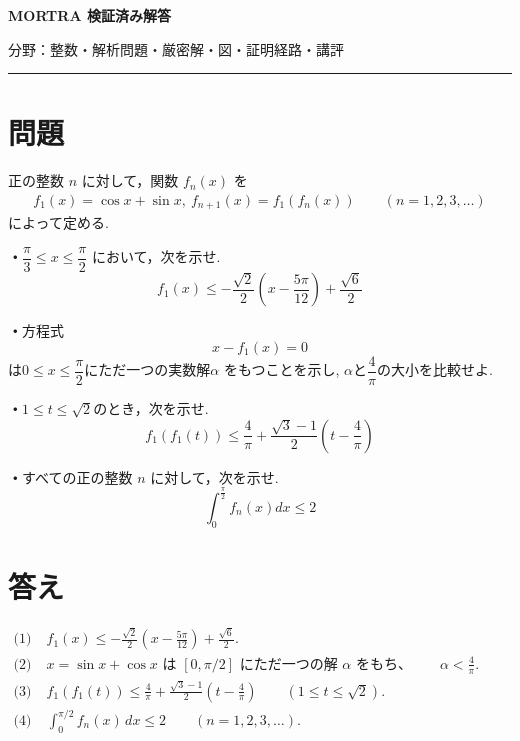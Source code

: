 \documentclass[uplatex,dvipdfmx,11pt]{jsarticle}
\begin{document}
\begin{center}
{\LARGE\bfseries MORTRA 検証済み解答\par}
\vspace{1mm}
{\small 分野：整数・解析\qquad 問題・厳密解・図・証明経路・講評}
\end{center}
\vspace{1mm}
\hrule
\vspace{5mm}

\section*{問題}
\noindent
正の整数 $n$ に対して，関数 $f_n(x)$ を
\begin{align*}
f_1(x)=\cos x+\sin x,\
f_{n+1}(x)=f_1(f_n(x))
\qquad (n=1,2,3,\ldots)
\end{align*}
によって定める.
\medskip


\par\medskip\noindent\textbf{・}\quad $\dfrac{\pi}{3}\leq x\leq \dfrac{\pi}{2}$
において，次を示せ.
\begin{equation*}
f_1(x)
\leq
-\frac{\sqrt{2}}{2}
\left(x-\frac{5\pi}{12}\right)
+
\frac{\sqrt{6}}{2}
\end{equation*}


\par\medskip\noindent\textbf{・}\quad 方程式
\begin{equation*}
x-f_1(x)=0
\end{equation*}
は$0\le x\le \dfrac{\pi}{2}$にただ一つの実数解$\alpha$ をもつことを示し, $\alpha$と$\dfrac{4}{\pi}$の大小を比較せよ.

\par\medskip\noindent\textbf{・}\quad $1\leq t\leq \sqrt{2}$のとき，次を示せ.
\begin{equation*}
f_1(f_1(t))
\leq
\frac{4}{\pi}
+
\frac{\sqrt{3}-1}{2}
\left(t-\frac{4}{\pi}\right)
\end{equation*}

\par\medskip\noindent\textbf{・}\quad すべての正の整数 $n$ に対して，次を示せ.
\begin{equation*}
\int_0^{\frac{\pi}{2}} f_n(x)dx\leq 2
\end{equation*}



\section*{答え}
\(\begin{aligned}\text{(1)}\;&f_1(x)\le-\frac{\sqrt2}2\left(x-\frac{5\pi}{12}\right)+\frac{\sqrt6}2.\\\text{(2)}\;&x=\sin x+\cos x\text{ は }[0,\pi/2]\text{ にただ一つの解 }\alpha\text{ をもち、}\qquad \alpha<\frac4\pi.\\\text{(3)}\;&f_1(f_1(t))\le\frac4\pi+\frac{\sqrt3-1}2\left(t-\frac4\pi\right)\qquad(1\le t\le\sqrt2).\\\text{(4)}\;&\int_0^{\pi/2}f_{n}(x)\,dx\le2\qquad(n=1,2,3,\ldots).\end{aligned}\)
\end{document}
